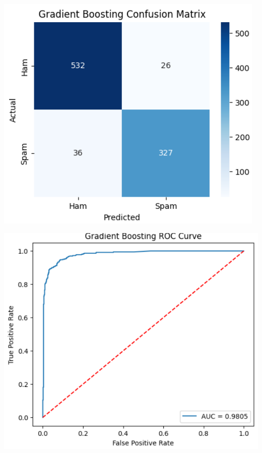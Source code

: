 \documentclass[12pt]{article}
\begin{document}
\begin{minipage}{0.45\textwidth}
\centering
\includegraphics[width=\linewidth]{32.png}
\end{minipage}
\hfill
\begin{minipage}{0.45\textwidth}
\centering
\includegraphics[width=\linewidth]{33.png}
\end{minipage}
\end{document}
